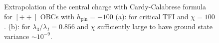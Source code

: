 	\begin{figure}[h!]
		\hspace{-0.4cm}
		\quad
		\caption{Extrapolation of the central charge with Cardy-Calabrese formula for $[++]$ OBCs with $h_\text{pin}=-100$ (a): for critical TFI and $\chi=100$. (b): for $\lambda_3/\lambda_I = 0.856$ and $\chi$ sufficiently large to have ground state variance $\sim 10^{-9}$.}
		\label{fig:cPin}
	\end{figure}


